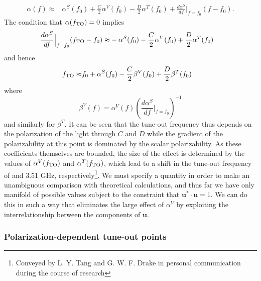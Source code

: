 	\begin{align}
		 \alpha(f)  \approx & \alpha^S(f_0) + \frac{C}{2}\alpha^V(f_0) -\frac{D}{2}\alpha^T(f_0) +  \frac{d\alpha^S}{df}\Bigr|_{f=f_0} (f-f_0).
	\end{align}
	The condition that $\alpha(f_\mathrm{TO})=0$ implies
	\begin{align}
		 \frac{d\alpha^S}{df}\Bigr|_{f=f_0} (f_\mathrm{TO}-f_0) \approx & -\alpha^S(f_0) - \frac{C}{2}\alpha^V(f_0) +\frac{D}{2}\alpha^T(f_0)
	\end{align}
	and hence
	\begin{align}
		 f_\mathrm{TO} \approx & f_0 + \alpha^S(f_0) - \frac{C}{2}\beta^V(f_0) +\frac{D}{2}\beta^T(f_0)
	\end{align}
	where 
	\begin{equation}
		\beta^V(f) = \alpha^V(f)\left(\frac{d\alpha^S}{df}\Bigr|_{f=f_0}\right)^{-1}
	\end{equation}
	and similarly for $\beta^T$.
	It can be seen that the tune-out frequency thus depends on the polarization of the light through $C$ and $D$ while the gradient of the polarizability at this point is dominated by the scalar polarizability. 
	As these coefficients themselves are bounded, the size of the effect is determined by the values of $\alpha^V(f_\mathrm{TO})$ and $\alpha^T(f_\mathrm{TO})$, which lead to a shift in the tune-out frequency of   and 3.51 GHz, respectively\footnote{Conveyed by L. Y. Tang and G. W. F. Drake in personal communication during the course of research}.
	We must specify a quantity in order to make an unambiguous comparison with theoretical calculations, and thus far we have only manifold of possible values subject to the constraint that $\mathbf{u}^*\cdot\mathbf{u}=1$.
	We can do this in such a way that eliminates the large effect of $\alpha^V$ by exploiting the interrelationship between the components of $\mathbf{u}$.


\subsubsection{Polarization-dependent tune-out points}


